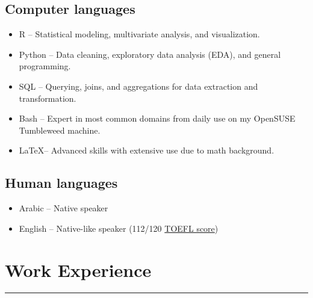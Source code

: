 \documentclass[10pt]{article}
\begin{document}
\subsection*{\Large{Computer languages}}
\begin{itemize}
	\item R -- Statistical modeling, multivariate analysis, and visualization.
	\item Python -- Data cleaning, exploratory data analysis (EDA), and general programming.
	\item SQL -- Querying, joins, and aggregations for data extraction and transformation.
	\item Bash -- Expert in most common domains from daily use on my OpenSUSE Tumbleweed machine.
	\item \LaTeX -- Advanced skills with extensive use due to math background.
\end{itemize}

\subsection*{\Large{Human languages}}
\begin{itemize}
	\item Arabic -- Native speaker
	\item English -- Native-like speaker (112/120 \href{https://drive.google.com/file/d/1S9nyRJj5tY12hFw3_XthDpG-YLtbXHaj/view?usp=sharing}{TOEFL score})
\end{itemize}




\section*{Work Experience}
\hrule
\vspace{3em}
\end{document}
